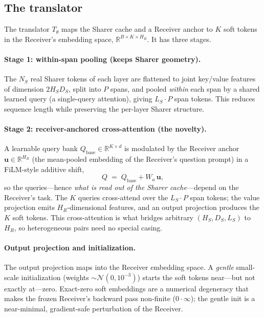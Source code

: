 \documentclass[11pt]{article}
\newcommand{\sharer}{\textsf{Sharer}\xspace}
\newcommand{\receiver}{\textsf{Receiver}\xspace}
\begin{document}
\subsection{The translator}\label{sec:translator}
The translator $T_\theta$ maps the \sharer cache and a \receiver anchor to $K$
soft tokens in the \receiver's embedding space, $\mathbb{R}^{B\times K\times
H_R}$. It has three stages.

\paragraph{Stage 1: within-span pooling (keeps \sharer geometry).} The $N_S$ real
\sharer tokens of each layer are flattened to joint key/value features of
dimension $2H_SD_S$, split into $P$ spans, and pooled \emph{within} each span by
a shared learned query (a single-query attention), giving $L_S{\cdot}P$ span
tokens. This reduces sequence length while preserving the per-layer \sharer
structure.

\paragraph{Stage 2: receiver-anchored cross-attention (the novelty).} A learnable
query bank $Q_{\text{base}}\in\mathbb{R}^{K\times d}$ is modulated by the
\receiver anchor $\mathbf{u}\in\mathbb{R}^{H_R}$ (the mean-pooled embedding of
the \receiver's question prompt) in a FiLM-style additive shift,
\[
  Q \;=\; Q_{\text{base}} + W_a\,\mathbf{u},
\]
so the queries---hence \emph{what is read out of the \sharer cache}---depend on
the \receiver's task. The $K$ queries cross-attend over the $L_S{\cdot}P$ span
tokens; the value projection emits $H_R$-dimensional features, and an output
projection produces the $K$ soft tokens. This cross-attention is what bridges
arbitrary $(H_S, D_S, L_S)$ to $H_R$, so heterogeneous pairs need no special
casing.

\paragraph{Output projection and initialization.} The output projection maps into
the \receiver embedding space. A \emph{gentle} small-scale initialization
(weights $\sim\mathcal{N}(0,10^{-3})$) starts the soft tokens near---but not
exactly at---zero. Exact-zero soft embeddings are a numerical degeneracy that
makes the frozen \receiver's backward pass non-finite ($0\cdot\infty$); the
gentle init is a near-minimal, gradient-safe perturbation of the \receiver.
\end{document}

